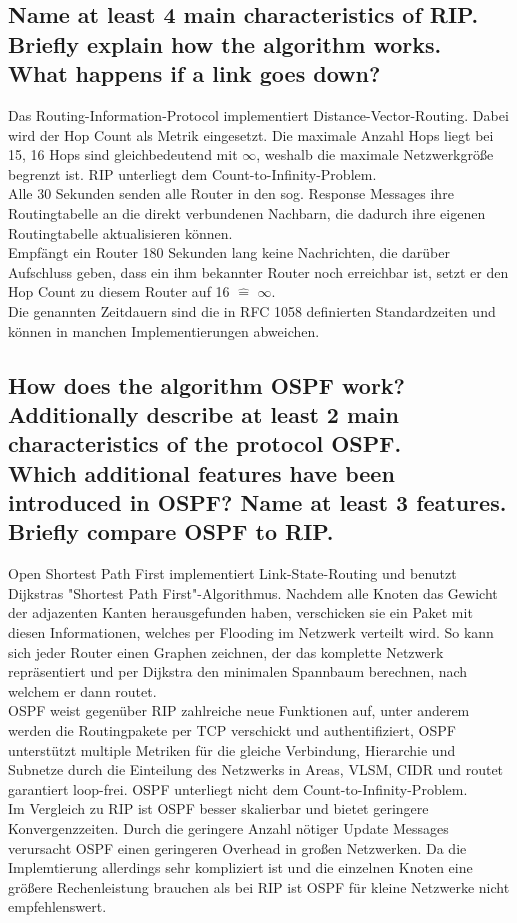 \documentclass[a4paper,
			llpt,
			solution,
			accentcolor=tud2d,
			colorbacktitle
			]
			{tudexercise}
\newcommand{\8}{$\infty$}
\begin{document}
\subsection{Name at least 4 main characteristics of RIP.\\Briefly explain how the algorithm works.\\ What happens if a link goes down?}
Das Routing-Information-Protocol implementiert Distance-Vector-Routing. Dabei wird der Hop Count als Metrik eingesetzt. Die maximale Anzahl Hops liegt bei 15, 16 Hops sind gleichbedeutend mit \8, weshalb die maximale Netzwerkgröße begrenzt ist. RIP unterliegt dem Count-to-Infinity-Problem.\\
Alle 30 Sekunden senden alle Router in den sog. Response Messages ihre Routingtabelle an die direkt verbundenen Nachbarn, die dadurch ihre eigenen Routingtabelle aktualisieren können.\\
Empfängt ein Router 180 Sekunden lang keine Nachrichten, die darüber Aufschluss geben, dass ein ihm bekannter Router noch erreichbar ist, setzt er den Hop Count zu diesem Router auf 16 $\hat{=}$ \8.\\
Die genannten Zeitdauern sind die in RFC 1058 definierten Standardzeiten und können in manchen Implementierungen abweichen.
\subsection{How does the algorithm OSPF work?\\Additionally describe at least 2 main characteristics  of the protocol OSPF.\\Which additional features have been introduced in OSPF? Name at least 3 features.\\Briefly compare OSPF to RIP.}
Open Shortest Path First implementiert Link-State-Routing und benutzt Dijkstras "Shortest Path First"-Algorithmus. Nachdem alle Knoten das Gewicht der adjazenten Kanten herausgefunden haben, verschicken sie ein Paket mit diesen Informationen, welches per Flooding im Netzwerk verteilt wird. So kann sich jeder Router einen Graphen zeichnen, der das komplette Netzwerk repräsentiert und per Dijkstra den minimalen Spannbaum berechnen, nach welchem er dann routet.\\
OSPF weist gegenüber RIP zahlreiche neue Funktionen auf, unter anderem werden die Routingpakete per TCP verschickt und authentifiziert, OSPF unterstützt multiple Metriken für die gleiche Verbindung, Hierarchie und Subnetze durch die Einteilung des Netzwerks in Areas, VLSM, CIDR und routet garantiert loop-frei. OSPF unterliegt nicht dem Count-to-Infinity-Problem.\\
Im Vergleich zu RIP ist OSPF besser skalierbar und bietet geringere Konvergenzzeiten. Durch die geringere Anzahl nötiger Update Messages verursacht OSPF einen geringeren Overhead in großen Netzwerken. Da die Implemtierung allerdings sehr kompliziert ist und die einzelnen Knoten eine größere Rechenleistung brauchen als bei RIP ist OSPF für kleine Netzwerke nicht empfehlenswert.
\end{document}
